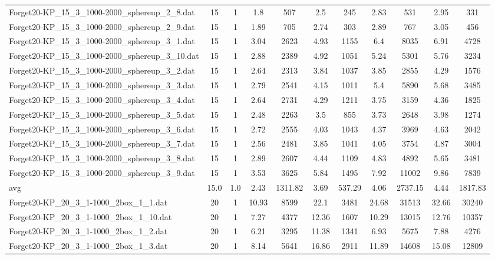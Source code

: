 \begin{table}[!ht]
\begin{tabular}{lcccccccccc}
Forget20-KP\_15\_3\_1000-2000\_sphereup\_2\_8.dat & 15 & 1 & 1.8 & 507 & 2.5 & 245 & 2.83 & 531 & 2.95 & 331 \\
Forget20-KP\_15\_3\_1000-2000\_sphereup\_2\_9.dat & 15 & 1 & 1.89 & 705 & 2.74 & 303 & 2.89 & 767 & 3.05 & 456 \\
Forget20-KP\_15\_3\_1000-2000\_sphereup\_3\_1.dat & 15 & 1 & 3.04 & 2623 & 4.93 & 1155 & 6.4 & 8035 & 6.91 & 4728 \\
Forget20-KP\_15\_3\_1000-2000\_sphereup\_3\_10.dat & 15 & 1 & 2.88 & 2389 & 4.92 & 1051 & 5.24 & 5301 & 5.76 & 3234 \\
Forget20-KP\_15\_3\_1000-2000\_sphereup\_3\_2.dat & 15 & 1 & 2.64 & 2313 & 3.84 & 1037 & 3.85 & 2855 & 4.29 & 1576 \\
Forget20-KP\_15\_3\_1000-2000\_sphereup\_3\_3.dat & 15 & 1 & 2.79 & 2541 & 4.15 & 1011 & 5.4 & 5890 & 5.68 & 3485 \\
Forget20-KP\_15\_3\_1000-2000\_sphereup\_3\_4.dat & 15 & 1 & 2.64 & 2731 & 4.29 & 1211 & 3.75 & 3159 & 4.36 & 1825 \\
Forget20-KP\_15\_3\_1000-2000\_sphereup\_3\_5.dat & 15 & 1 & 2.48 & 2263 & 3.5 & 855 & 3.73 & 2648 & 3.98 & 1274 \\
Forget20-KP\_15\_3\_1000-2000\_sphereup\_3\_6.dat & 15 & 1 & 2.72 & 2555 & 4.03 & 1043 & 4.37 & 3969 & 4.63 & 2042 \\
Forget20-KP\_15\_3\_1000-2000\_sphereup\_3\_7.dat & 15 & 1 & 2.56 & 2481 & 3.85 & 1041 & 4.05 & 3754 & 4.87 & 3004 \\
Forget20-KP\_15\_3\_1000-2000\_sphereup\_3\_8.dat & 15 & 1 & 2.89 & 2607 & 4.44 & 1109 & 4.83 & 4892 & 5.65 & 3481 \\
Forget20-KP\_15\_3\_1000-2000\_sphereup\_3\_9.dat & 15 & 1 & 3.53 & 3625 & 5.84 & 1495 & 7.92 & 11002 & 9.86 & 7839 \\
\hline avg & 15.0 & 1.0 & 2.43& 1311.82 & 3.69& 537.29 & 4.06& 2737.15 & 4.44& 1817.83\\ \hline
Forget20-KP\_20\_3\_1-1000\_2box\_1\_1.dat & 20 & 1 & 10.93 & 8599 & 22.1 & 3481 & 24.68 & 31513 & 32.66 & 30240 \\
Forget20-KP\_20\_3\_1-1000\_2box\_1\_10.dat & 20 & 1 & 7.27 & 4377 & 12.36 & 1607 & 10.29 & 13015 & 12.76 & 10357 \\
Forget20-KP\_20\_3\_1-1000\_2box\_1\_2.dat & 20 & 1 & 6.21 & 3295 & 11.38 & 1341 & 6.93 & 5675 & 7.88 & 4276 \\
Forget20-KP\_20\_3\_1-1000\_2box\_1\_3.dat & 20 & 1 & 8.14 & 5641 & 16.86 & 2911 & 11.89 & 14608 & 15.08 & 12809 \\

\end{tabular}
\end{table}
